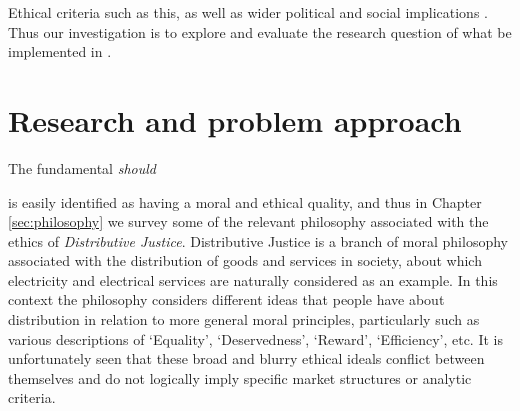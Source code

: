 Ethical criteria such as this, as well as wider political and social implications \DIFdelbegin {}\DIFdelend \DIFaddbegin {}\DIFaddend . 
Thus our investigation is to explore and evaluate the research question of what \DIFdelbegin {}\textit{} %
\DIFdelend \DIFaddbegin {}\DIFaddend be implemented in \DIFdelbegin {}\DIFdelend \DIFaddbegin {}\DIFaddend .


\DIFaddbegin \noindent {}


\DIFaddend \section{Research and problem approach}

The fundamental \DIFdelbegin {}\DIFdelend \DIFaddbegin {}\DIFaddend \textit{should} \DIFdelbegin {}\DIFdelend \DIFaddbegin {}

\DIFaddend is easily identified as having a moral and ethical quality, and thus in Chapter \ref{sec:philosophy} we survey some of the relevant philosophy associated with the ethics of \textit{Distributive Justice}.
Distributive Justice is a branch of moral philosophy associated with the distribution of goods and services in society, about which electricity and electrical services are naturally considered as an example.
In this context the philosophy considers different ideas that people have about distribution in relation to more general moral principles, particularly such as various descriptions of `Equality', `Deservedness', `Reward', `Efficiency', etc.
It is unfortunately seen that these broad and blurry ethical ideals conflict between themselves and do not logically imply specific market structures or analytic criteria.


